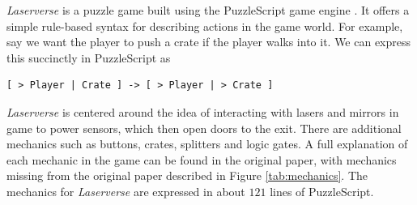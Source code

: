\documentclass[letterpaper]{article}
\begin{document}
\textit{Laserverse} is a puzzle game built using the PuzzleScript game engine \cite{puzzlescript}. It offers a simple
rule-based syntax for describing actions in the game world. For example, say we want the player to push a crate if the
player walks into it. We can express this succinctly in PuzzleScript as
\begin{Verbatim}[fontsize=\small]
[ > Player | Crate ] -> [ > Player | > Crate ]
\end{Verbatim}

\textit{Laserverse} is centered around the idea of interacting with lasers and mirrors in game to power sensors, which
then open doors to the exit. There are additional mechanics such as buttons, crates, splitters and logic gates. A full
explanation of each mechanic in the game can be found in the original paper, with mechanics missing from the original
paper described in Figure \ref{tab:mechanics}. The mechanics for \textit{Laserverse} are expressed in about $121$ lines
of PuzzleScript.
\end{document}
